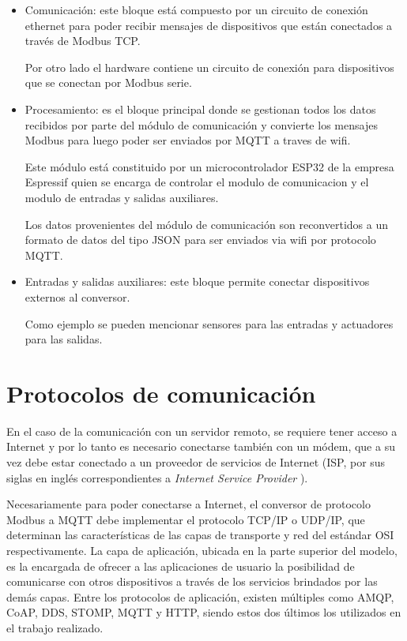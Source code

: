 \begin{itemize}
	\item Comunicación: este bloque está compuesto por un circuito de conexión ethernet para poder recibir mensajes de dispositivos que están conectados a través de Modbus TCP. 
	
	Por otro lado el hardware contiene un circuito de conexión para dispositivos que se conectan por Modbus serie.
	
	\item Procesamiento: es el bloque principal donde se gestionan todos los datos recibidos por parte del módulo de comunicación y  convierte los mensajes Modbus para luego poder ser enviados por MQTT a traves de wifi.  
	
	Este módulo está constituido por un microcontrolador ESP32 \citep{WEBSITE:11} de la empresa Espressif \citep{WEBSITE:10} quien se encarga de controlar el modulo de comunicacion y el modulo de entradas y salidas auxiliares.
	
	Los datos provenientes del módulo de comunicación son reconvertidos a un formato de datos del tipo JSON \citep{WEBSITE:12} para ser enviados via wifi por protocolo MQTT.
	
	
	\item Entradas y salidas auxiliares: este bloque permite conectar dispositivos externos al conversor. 
	
	Como ejemplo se pueden mencionar sensores para las entradas y actuadores para las salidas. 
	
	
\end{itemize}


\section{Protocolos de comunicación}
En el caso de la comunicación con un servidor remoto, se requiere tener acceso a Internet y por lo tanto es necesario conectarse también con un módem, que a
su vez debe estar conectado a un proveedor de servicios de Internet (ISP, por sus siglas en inglés correspondientes a \textit{Internet Service Provider} ).

Necesariamente para poder conectarse a Internet, el conversor de protocolo Modbus a MQTT debe implementar el protocolo TCP/IP\citep{WEBSITE:15} o UDP/IP,\citep{WEBSITE:16} que determinan las características de las capas de transporte y red del estándar OSI \citep{WEBSITE:13} respectivamente. La capa de aplicación, ubicada en la parte superior del modelo, es la encargada de ofrecer a las aplicaciones de usuario la posibilidad de comunicarse con otros dispositivos a través de los servicios brindados por las demás capas. Entre los protocolos de aplicación, existen múltiples como AMQP, CoAP, DDS, STOMP, MQTT y HTTP, siendo estos dos últimos los utilizados en el trabajo realizado.

